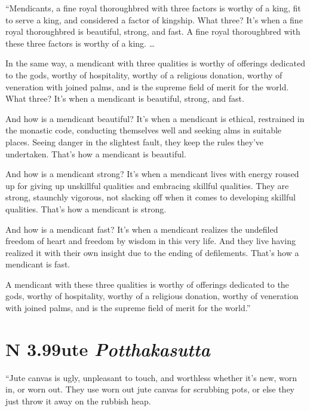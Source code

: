 \documentclass[12pt,openany]{book}%
\newcommand*{\suttatitleacronym}[1]{\smaller[2]{#1}\vspace*{.3em}}
\newcommand*{\suttatitletranslation}[1]{\linebreak{#1}}
\newcommand*{\suttatitleroot}[1]{\linebreak\smaller[2]\itshape{#1}}
\newcommand*{\tocacronym}[1]{\hspace*{-3.3em}{#1}\quad}
\newcommand*{\toctranslation}[1]{#1}
\newcommand*{\tocroot}[1]{(\textit{#1})}
\begin{document}
“Mendicants, a fine royal thoroughbred with three factors is worthy of a king, fit to serve a king, and considered a factor of kingship. What three? It’s when a fine royal thoroughbred is beautiful, strong, and fast. A fine royal thoroughbred with these three factors is worthy of a king. … 

In the same way, a mendicant with three qualities is worthy of offerings dedicated to the gods, worthy of hospitality, worthy of a religious donation, worthy of veneration with joined palms, and is the supreme field of merit for the world. What three? It’s when a mendicant is beautiful, strong, and fast. 

And how is a mendicant beautiful? It’s when a mendicant is ethical, restrained in the monastic code, conducting themselves well and seeking alms in suitable places. Seeing danger in the slightest fault, they keep the rules they’ve undertaken. That’s how a mendicant is beautiful. 

And how is a mendicant strong? It’s when a mendicant lives with energy roused up for giving up unskillful qualities and embracing skillful qualities. They are strong, staunchly vigorous, not slacking off when it comes to developing skillful qualities. That’s how a mendicant is strong. 

And how is a mendicant fast? It’s when a mendicant realizes the undefiled freedom of heart and freedom by wisdom in this very life. And they live having realized it with their own insight due to the ending of defilements. That’s how a mendicant is fast. 

A mendicant with these three qualities is worthy of offerings dedicated to the gods, worthy of hospitality, worthy of a religious donation, worthy of veneration with joined palms, and is the supreme field of merit for the world.” 

%
\section*{{\suttatitleacronym AN 3.99}{\suttatitletranslation Jute }{\suttatitleroot Potthakasutta}}
\addcontentsline{toc}{section}{\tocacronym{AN 3.99} \toctranslation{Jute } \tocroot{Potthakasutta}}

“Jute canvas is ugly, unpleasant to touch, and worthless whether it’s new, worn in, or worn out. They use worn out jute canvas for scrubbing pots, or else they just throw it away on the rubbish heap. 
\end{document}
